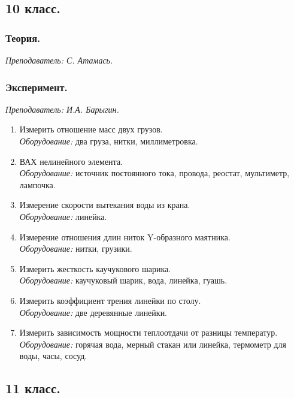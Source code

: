 \documentclass[11pt]{article}
\newlength{\h}
\newlength{\x}
\begin{document}
\subsection{10 класс.}
\label{sec:daily10}

\subsubsection{Теория.}
\label{sec:th10}

\textit{Преподаватель: С. Атамась.}

\subsubsection{Эксперимент.}
\label{sec:exp10}

\textit{Преподаватель: И.А. Барыгин.}\\
\begin{enumerate}
\item Измерить отношение масс двух грузов.\\
  \textit{Оборудование:} два груза, нитки, миллиметровка.
\item ВАХ нелинейного элемента.\\
  \textit{Оборудование:} источник постоянного тока, провода, реостат,
  мультиметр, лампочка.
\item Измерение скорости вытекания воды из крана.\\
  \textit{Оборудование:} линейка.
\item Измерение отношения длин ниток Y-образного маятника.\\
  \textit{Оборудование:} нитки, грузики.
\item Измерить жесткость каучукового шарика.\\
  \textit{Оборудование:} каучуковый шарик, вода, линейка, гуашь.
\item Измерить коэффициент трения линейки по столу.\\
  \textit{Оборудование:} две деревянные линейки.
\item Измерить зависимость мощности теплоотдачи от разницы температур.\\
  \textit{Оборудование:} горячая вода, мерный стакан или линейка,
  термометр для воды, часы, сосуд.
\end{enumerate}

\subsection{11 класс.}
\label{sec:daily11}
\end{document}
